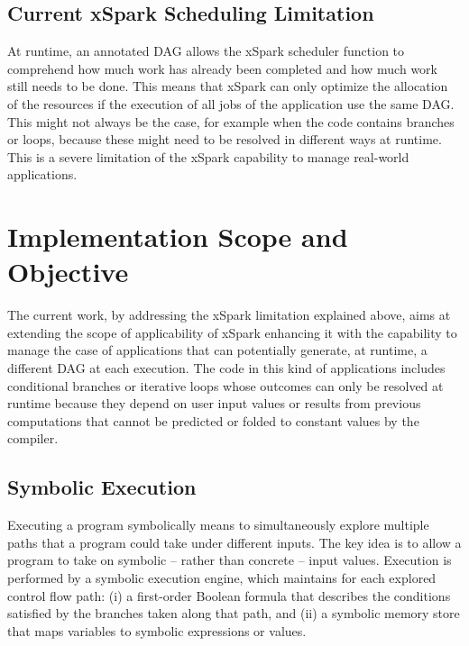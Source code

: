 \subsection{Current xSpark Scheduling Limitation}\label{sec:impl_xspark_sched_limitation}
At runtime, an annotated DAG allows the xSpark scheduler function to comprehend how much work has already been completed and how much work still needs to be done. This means that xSpark can only optimize the allocation of the resources if the execution of all jobs of the application use the same DAG. This might not always be the case, for example when the code contains branches or loops, because these might need to be resolved in different ways at runtime. This is a severe limitation of the xSpark capability to manage real-world applications.

\section{Implementation Scope and Objective}\label{sec:impl_scope_objective}
The current work, by addressing the xSpark limitation explained above, aims at extending the scope of applicability of xSpark enhancing it with the capability to manage the case of applications that can potentially generate, at runtime, a different DAG at each execution. The code in this kind of applications includes conditional branches or iterative loops whose outcomes can only be resolved at runtime because they depend on user input values or results from previous computations that cannot be predicted or folded to constant values by the compiler. 
\subsection{Symbolic Execution}\label{sec:impl_symbolic_execution}
Executing a program symbolically means to simultaneously explore multiple paths that a program could take under different inputs. The key idea is to allow a program to take on symbolic – rather than concrete – input values. Execution is performed by a symbolic execution engine, which maintains for each explored control flow path: 
(i)	a first-order Boolean formula that describes the conditions satisfied by the branches taken along that path, and (ii) a symbolic memory store that maps variables to symbolic expressions or values. 

